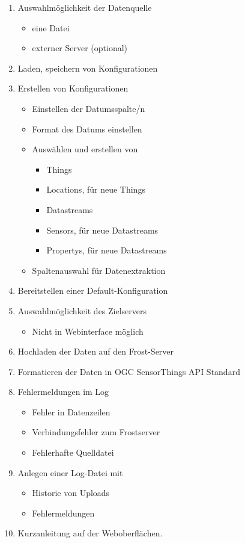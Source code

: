 \documentclass[12 pt]{article}
\begin{document}
	\begin{enumerate}
		\item Auswahlmöglichkeit der Datenquelle
		\begin{itemize}
			\item eine Datei
			\item externer Server (optional)
		\end{itemize}
		
		\item Laden, speichern von Konfigurationen
		
		\item Erstellen von Konfigurationen
		\begin{itemize}
			\item Einstellen der Datumsspalte/n
			\item Format des Datums einstellen
			\item Auswählen und erstellen von
			\begin{itemize}
				\item Things
				\item Locations, für neue Things
				\item Datastreams
				\item Sensors, für neue Datastreams
				\item Propertys, für neue Datastreams
			\end{itemize}
			\item Spaltenauswahl für Datenextraktion
		\end{itemize}
		
		\item Bereitstellen einer Default-Konfiguration
		
		\item Auswahlmöglichkeit des Zielservers
		\begin{itemize}
			\item Nicht in Webinterface möglich
		\end{itemize}
		
		\item Hochladen der Daten auf den Frost-Server
		
		\item Formatieren der Daten in OGC SensorThings API Standard
		
		\item Fehlermeldungen im Log
		\begin{itemize}
			\item Fehler in Datenzeilen
			\item Verbindungsfehler zum Frostserver
			\item Fehlerhafte Quelldatei
		\end{itemize}
		
		\item Anlegen einer Log-Datei mit
		\begin{itemize}
			\item Historie von Uploads
			\item Fehlermeldungen
		\end{itemize}
		
		\item Kurzanleitung auf der Weboberflächen.
	\end{enumerate}
	
\end{document}
